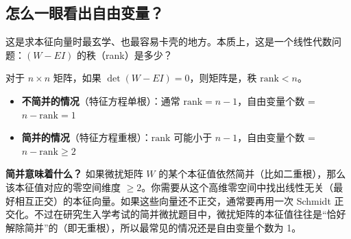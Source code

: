 \subsection{怎么一眼看出自由变量？}

这是求本征向量时最玄学、也最容易卡壳的地方。本质上，这是一个线性代数问题：$(W - EI)$ 的秩（rank）是多少？

\begin{insightbox}[核心定理：秩亏缺 = 自由变量个数]
对于 $n \times n$ 矩阵，如果 $\det(W - EI) = 0$，则矩阵是，秩 $\text{rank} < n$。
\begin{itemize}[nosep]
    \item \textbf{不简并的情况}（特征方程单根）：通常 $\text{rank} = n-1$，自由变量个数 = $n - \text{rank} = 1$
    \item \textbf{简并的情况}（特征方程重根）：$\text{rank}$ 可能小于 $n-1$，自由变量个数 = $n - \text{rank} \ge 2$
\end{itemize}

\textbf{简并意味着什么？} 如果微扰矩阵 $W$ 的某个本征值依然简并（比如二重根），那么该本征值对应的零空间维度 $\ge 2$。你需要从这个高维零空间中找出线性无关（最好相互正交）的本征向量。如果这些向量还不正交，通常要再用一次 Schmidt 正交化。不过在研究生入学考试的简并微扰题目中，微扰矩阵的本征值往往是``恰好解除简并''的（即无重根），所以最常见的情况还是自由变量个数为 1。
\end{insightbox}

